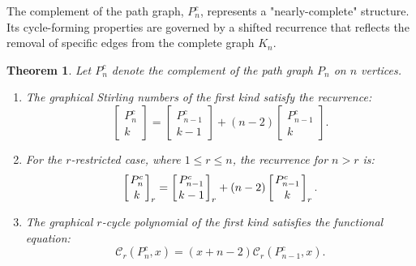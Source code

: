 \documentclass{amsart}
\newcommand{\str}[2]{\left[ \genfrac{}{}{0pt}{}{#1}{#2} \right]_r}
\newcommand{\cyc}{\mathcal{C}}
\newtheorem{theorem}{Theorem}[section]
\theoremstyle{definition}
\def\st#1#2{\begin{bmatrix} #1 \\ #2 \end{bmatrix}}
\begin{document}
The complement of the path graph, $P_n^c$, represents a "nearly-complete" structure. Its cycle-forming properties are governed by a shifted recurrence that reflects the removal of specific edges from the complete graph $K_n$.

\begin{theorem}
\label{thm:path_complement}
Let $P_n^c$ denote the complement of the path graph $P_n$ on $n$ vertices. 
\begin{enumerate}
    \item[(i)] The graphical Stirling numbers of the first kind satisfy the recurrence:
    \begin{equation*}
        \st{P_n^c}{k} = \st{P_{n-1}^c}{k-1} + (n-2) \st{P_{n-1}^c}{k}.
    \end{equation*}
    
    \item[(ii)] For the $r$-restricted case, where $1 \leq r \leq n$, the recurrence for $n > r$ is:
    \begin{equation*}
        \str{P_n^c}{k} = \str{P_{n-1}^c}{k-1} + (n-2) \str{P_{n-1}^c}{k}.
    \end{equation*}
    
    \item[(iii)] The graphical $r$-cycle polynomial of the first kind satisfies the functional equation:
    \begin{equation*}
        \cyc_r(P_n^c, x) = (x + n - 2) \cyc_r(P_{n-1}^c, x).
    \end{equation*}
\end{enumerate}
\end{theorem}
\end{document}
